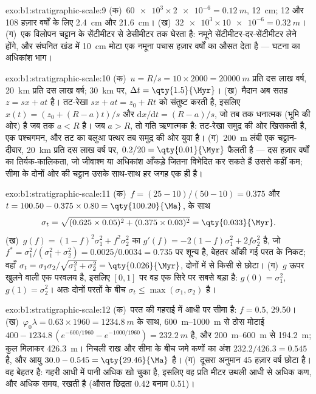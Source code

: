 \begin{solution}{exo:b1:stratigraphic-scale:9}
(क)~$\num{60e3} \times \num{2e-6} = \qty{0.12}{m}$, \qty{12}{cm}; 12 और 108 हज़ार वर्षों
के लिए \qty{2.4}{cm} और \qty{21.6}{cm}। (ख)~$\num{32e3} \times
\num{10e-6} = \qty{0.32}{m}$। (ग)~एक विलोपन चट्टान के सेंटीमीटर से डेसीमीटर तक घेरता
है: नमूने सेंटीमीटर-दर-सेंटीमीटर लेने होंगे, और संघनित खंड में \qty{10}{cm} मोटा एक
नमूना पचास हज़ार वर्षों का औसत देता है --- घटना का अधिकांश भाग।
\end{solution}

\begin{solution}{exo:b1:stratigraphic-scale:10}
(क)~$u = R/s = 10 \times 2000 = \qty{20000}{m}$ प्रति दस लाख वर्ष,
\qty{20}{km} प्रति दस लाख वर्ष; \qty{30}{km} पर, $\Delta t = \qty{1.5}{\Myr}$।
(ख)~मैदान अब सतह $z = s x + a t$ है। तट-रेखा $s x + a t = z_0 + R t$ को संतुष्ट करती
है, इसलिए $x(t) = (z_0 + (R - a)t)/s$ और $\mathrm dx/\mathrm dt = (R - a)/s$, जो तब तक
धनात्मक (भूमि की ओर) है जब तक $a < R$ है। जब $a > R$, तो गति ऋणात्मक है: तट-रेखा
समुद्र की ओर खिसकती है, एक पश्चगमन, और तट का बलुआ पत्थर तब समुद्र की ओर युवा है।
(ग)~\qty{200}{m} लंबी एक चट्टान-दीवार, \qty{20}{km} प्रति दस लाख वर्ष पर, $0.2/20 = \qty{0.01}{\Myr}$ फैलती है --- दस हज़ार वर्षों का तिर्यक-कालिकता, जो जीवाश्म या अधिकांश
आँकड़े जितना विभेदित कर सकते हैं उससे कहीं कम; सीमा के दोनों ओर की चट्टान उसके साथ-साथ
हर जगह एक ही है।
\end{solution}

\begin{solution}{exo:b1:stratigraphic-scale:11}
(क)~$f = (25 - 10)/(50 - 10) = 0.375$ और $t = 100.50 - 0.375 \times 0.80 =
\qty{100.20}{\Ma}$, के साथ
\[
  \sigma_t = \sqrt{(0.625 \times 0.05)^2 + (0.375 \times 0.03)^2} = \qty{0.033}{\Myr}.
\] (ख)~$g(f) = (1 - f)^2\sigma_1^2 + f^2\sigma_2^2$ का $g'(f) = -2(1 - f)\sigma_1^2 + 2f\sigma_2^2$ है, जो $f^* =
\sigma_1^2/(\sigma_1^2 + \sigma_2^2) = 0.0025/0.0034 = 0.735$ पर शून्य है, बेहतर आँकी गई परत के निकट; वहाँ $\sigma_t = \sigma_1\sigma_2/\sqrt{\sigma_1^2 + \sigma_2^2} =
\qty{0.026}{\Myr}$, दोनों में से किसी से छोटा। (ग)~$g$ ऊपर खुलने वाली एक परवलय है, इसलिए $[0, 1]$ पर वह एक सिरे पर सबसे बड़ा है: $g(0) = \sigma_1^2$, $g(1) = \sigma_2^2$। अतः दोनों परतों के बीच $\sigma_t \le \max(\sigma_1, \sigma_2)$ है।
\end{solution}

\begin{solution}{exo:b1:stratigraphic-scale:12}
(क)~परत की गहराई में आधी पर सीमा है: $f = 0.5$, \qty{29.50}{\Ma}। (ख)~$\varphi_0\lambda = 0.63 \times 1960 = \qty{1234.8}{m}$ के साथ, \qtyrange{600}{1000}{m} से ठोस मोटाई $400 - 1234.8\,(e^{-600/1960} - e^{-1000/1960}) =
\qty{232.2}{m}$ है, और \qtyrange{200}{600}{m} से \qty{194.2}{m}; कुल मिलाकर \qty{426.3}{m}। निचली राख और सीमा के बीच जमे कणों का अंश $232.2/426.3 = 0.545$ है, और आयु $30.0 - 0.545 =
\qty{29.46}{\Ma}$ है। (ग)~दूसरा अनुमान \num{45} हज़ार वर्ष छोटा है। वह बेहतर है: गहरी आधी में पानी अधिक खो चुका है, इसलिए वह प्रति मीटर उथली आधी से अधिक कण, और अधिक समय, रखती है (औसत छिद्रता \num{0.42} बनाम \num{0.51})।
\end{solution}

